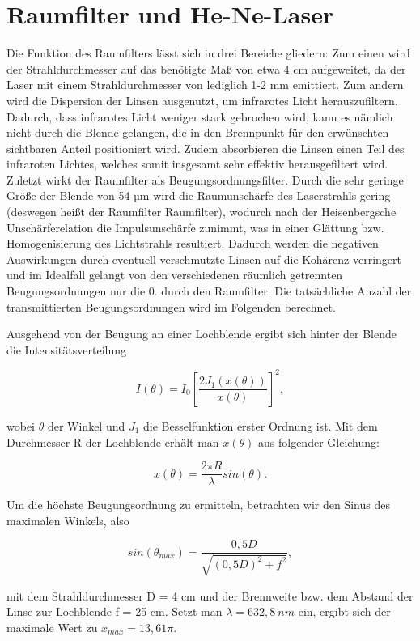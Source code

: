 \documentclass[bigchapter,colorback,accentcolor=tud4b,linedtoc,11pt]{tudreport}
\begin{document}
\section{Raumfilter und He-Ne-Laser}

Die Funktion des Raumfilters lässt sich in drei Bereiche gliedern: Zum einen wird der Strahldurchmesser auf das benötigte Maß von etwa 4 cm aufgeweitet, da der Laser mit einem Strahldurchmesser von lediglich 1-2 mm emittiert. Zum andern wird die Dispersion der Linsen ausgenutzt, um infrarotes Licht herauszufiltern. Dadurch, dass infrarotes Licht weniger stark gebrochen wird, kann es nämlich nicht durch die Blende gelangen, die in den Brennpunkt für den erwünschten sichtbaren Anteil positioniert wird. Zudem absorbieren die Linsen einen Teil des infraroten Lichtes, welches somit insgesamt sehr effektiv herausgefiltert wird. Zuletzt wirkt der Raumfilter als Beugungsordnungsfilter. Durch die sehr geringe Größe der Blende von 54 µm wird die Raumunschärfe des Laserstrahls gering (deswegen heißt der Raumfilter Raumfilter), wodurch nach der Heisenbergsche Unschärferelation die Impulsunschärfe zunimmt, was in einer Glättung bzw. Homogenisierung des Lichtstrahls resultiert. Dadurch werden die negativen Auswirkungen durch eventuell verschmutzte Linsen auf die Kohärenz verringert und im Idealfall gelangt von den verschiedenen räumlich getrennten Beugungsordnungen nur die 0. durch den Raumfilter. Die tatsächliche Anzahl der transmittierten Beugungsordnungen wird im Folgenden berechnet.

Ausgehend von der Beugung an einer Lochblende ergibt sich hinter der Blende die Intensitätsverteilung

$$I(\theta) = I_0 \left[ \frac{2 J_1(x(\theta))}{x(\theta)} \right]^2,$$

wobei $\theta$ der Winkel und $J_1$ die Besselfunktion erster Ordnung ist. Mit dem Durchmesser R der Lochblende erhält man $x(\theta)$ aus folgender Gleichung: 

$$x(\theta) = \frac{2 \pi R}{\lambda} sin(\theta).$$

Um die höchste Beugungsordnung zu ermitteln, betrachten wir den Sinus des maximalen Winkels, also

$$sin(\theta_{max}) = \frac{0,5 D}{\sqrt{(0,5 D)^2 + f^2}},$$

mit dem Strahldurchmesser D = 4 cm und der Brennweite bzw. dem Abstand der Linse zur Lochblende f = 25 cm. Setzt man $\lambda = 632,8~nm$ ein, ergibt sich der maximale Wert zu $x_{max} = 13,61 \pi$.
\end{document}
